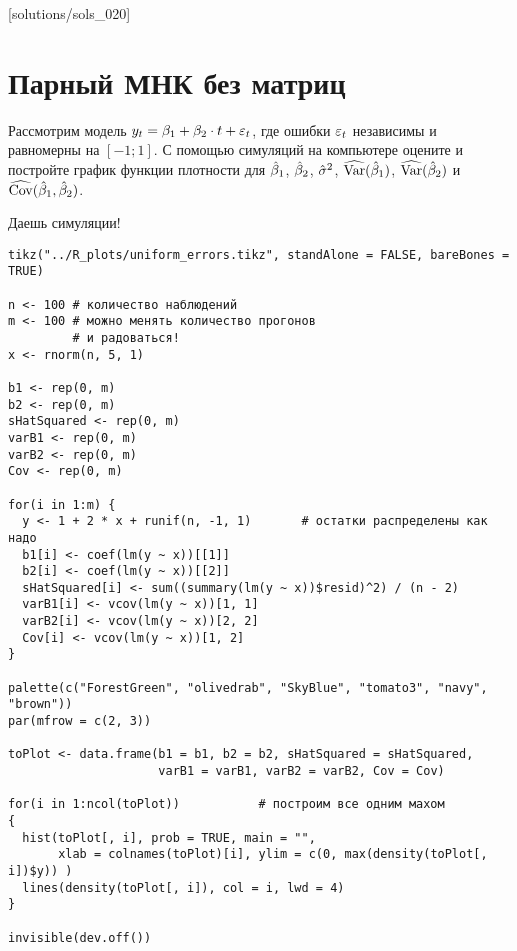 [solutions/sols_020]

\chapter{Парный МНК без матриц}


\begin{problem}
Рассмотрим модель $y_t=\b_1+\b_2 \cdot t + \e_t$, где ошибки $\e_t$ независимы и равномерны на $[-1;1]$. С помощью симуляций на компьютере оцените и постройте график функции плотности для $\hb_1$, $\hb_2$, $\hs^2$, $\hVar(\hb_1)$, $\hVar(\hb_2)$ и $\hCov(\hb_1,\hb_2)$.


\begin{sol}
Даешь симуляции!

\begin{verbatim}
tikz("../R_plots/uniform_errors.tikz", standAlone = FALSE, bareBones = TRUE)

n <- 100 # количество наблюдений
m <- 100 # можно менять количество прогонов
         # и радоваться!
x <- rnorm(n, 5, 1)

b1 <- rep(0, m)
b2 <- rep(0, m)
sHatSquared <- rep(0, m)
varB1 <- rep(0, m)
varB2 <- rep(0, m)
Cov <- rep(0, m)

for(i in 1:m) {
  y <- 1 + 2 * x + runif(n, -1, 1)       # остатки распределены как надо
  b1[i] <- coef(lm(y ~ x))[[1]]
  b2[i] <- coef(lm(y ~ x))[[2]]
  sHatSquared[i] <- sum((summary(lm(y ~ x))$resid)^2) / (n - 2)
  varB1[i] <- vcov(lm(y ~ x))[1, 1]
  varB2[i] <- vcov(lm(y ~ x))[2, 2]
  Cov[i] <- vcov(lm(y ~ x))[1, 2]
}

palette(c("ForestGreen", "olivedrab", "SkyBlue", "tomato3", "navy", "brown"))
par(mfrow = c(2, 3))

toPlot <- data.frame(b1 = b1, b2 = b2, sHatSquared = sHatSquared,
                     varB1 = varB1, varB2 = varB2, Cov = Cov)

for(i in 1:ncol(toPlot))           # построим все одним махом
{
  hist(toPlot[, i], prob = TRUE, main = "",
       xlab = colnames(toPlot)[i], ylim = c(0, max(density(toPlot[, i])$y)) )
  lines(density(toPlot[, i]), col = i, lwd = 4)
}

invisible(dev.off())
\end{verbatim}

\begin{minipage}{0.6\textwidth}
\begin{center}
\begin{tikzpicture}[scale = 0.025]

\end{tikzpicture}
\end{center}
\end{minipage}

\end{sol}
\end{problem}



